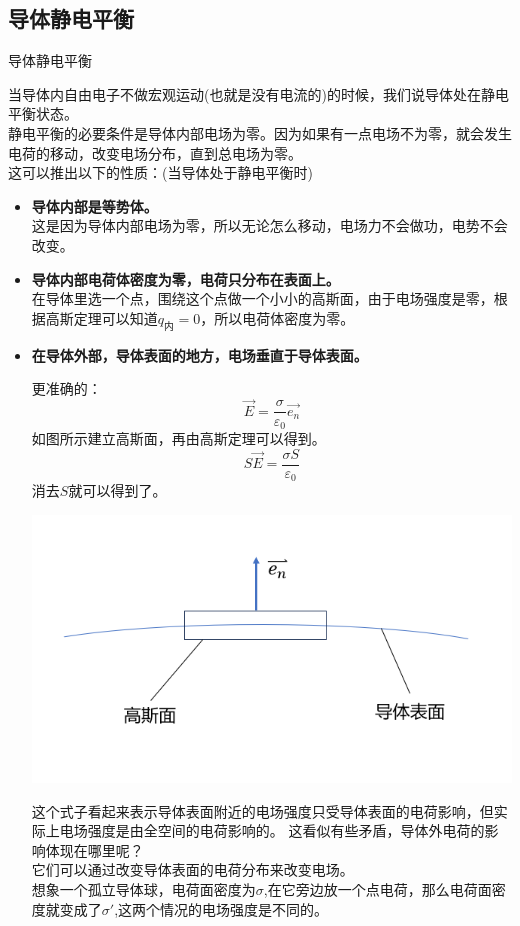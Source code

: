 \documentclass[cn,hazy,blue,14pt,normal]{elegantnote}
\numberwithin{equation}{section}
\begin{document}
\subsection{导体静电平衡}
\begin{definition}
  导体静电平衡
\end{definition}
当导体内自由电子不做宏观运动(也就是没有电流的)的时候，我们说导体处在静电平衡状态。\\
静电平衡的必要条件是导体内部电场为零。因为如果有一点电场不为零，就会发生电荷的移动，改变电场分布，直到总电场为零。\\
这可以推出以下的性质：(当导体处于静电平衡时)
\begin{itemize}
	\item \textbf{导体内部是等势体。}\\
	这是因为导体内部电场为零，所以无论怎么移动，电场力不会做功，电势不会改变。
	\item \textbf{导体内部电荷体密度为零，电荷只分布在表面上。}\\
	在导体里选一个点，围绕这个点做一个小小的高斯面，由于电场强度是零，根据高斯定理可以知道$q_{\text{内}}=0$，所以电荷体密度为零。
	\item \textbf{在导体外部，导体表面的地方，电场垂直于导体表面。}

\begin{minipage}{0.5\textwidth}
	更准确的：
	\begin{equation}\label{导体表面电场}
		\vec{E}=\frac{\sigma}{\varepsilon_0}\vec{e_n}
	\end{equation}
	如图所示建立高斯面，再由高斯定理可以得到。
	$$
		S\vec{E} = \frac{\sigma S}{\varepsilon_0}
	$$
	消去$S$就可以得到了。
	\end{minipage}
	\begin{minipage}{0.5\textwidth}
		\includegraphics[width=\textwidth]{image/2.1.1.png}
	\end{minipage}
	\begin{note}
		这个式子看起来表示导体表面附近的电场强度只受导体表面的电荷影响，但实际上电场强度是由全空间的电荷影响的。
		这看似有些矛盾，导体外电荷的影响体现在哪里呢？\\
		它们可以通过改变导体表面的电荷分布来改变电场。\\
		想象一个孤立导体球，电荷面密度为$\sigma$,在它旁边放一个点电荷，那么电荷面密度就变成了$\sigma '$,这两个情况的电场强度是不同的。
	\end{note}
\end{itemize}
\end{document}
